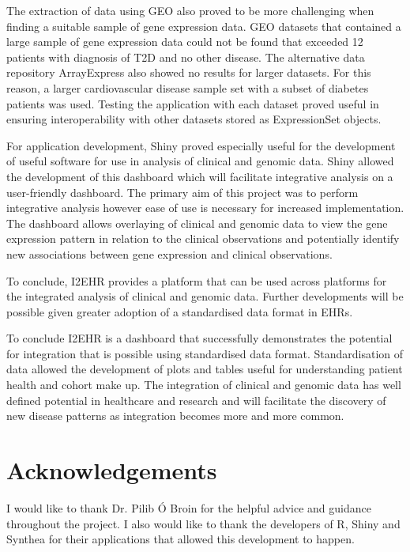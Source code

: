 \documentclass{bioinfo}
\begin{document}
\begin{Discussion}
The extraction of data using GEO also proved to be more challenging when finding a suitable sample of gene expression data. GEO datasets that contained a large sample of gene expression data could not be found that exceeded 12 patients with diagnosis of T2D and no other disease. The alternative data repository ArrayExpress \citep{Athar2018} also showed no results for larger datasets. For this reason, a larger cardiovascular disease sample set with a subset of diabetes patients was used. Testing the application with each dataset proved useful in ensuring interoperability with other datasets stored as ExpressionSet objects. 


For application development, Shiny proved especially useful for the development of useful software for use in analysis of clinical and genomic data. Shiny allowed the development of this dashboard which will facilitate integrative analysis on a user-friendly dashboard. The primary aim of this project was to perform integrative analysis however ease of use is necessary for increased implementation. The dashboard allows overlaying of clinical and genomic data to view the gene expression pattern in relation to the clinical observations and potentially identify new associations between gene expression and clinical observations. 


To conclude, I2EHR provides a platform that can be used across platforms for the integrated analysis of clinical and genomic data. Further developments will be possible given greater adoption of a standardised data format in EHRs.


To conclude I2EHR is a dashboard that successfully demonstrates the potential for integration that is possible using standardised data format. Standardisation of data allowed the development of plots and tables useful for understanding patient health and cohort make up. The integration of clinical and genomic data has well defined potential in healthcare and research and will facilitate the discovery of new disease patterns as integration becomes more and more common. 


\end{Discussion} 


%
%


\section*{Acknowledgements}
I would like to thank Dr. Pilib \'{O} Broin for the helpful advice and guidance throughout the project. I also would like to thank the developers of R, Shiny and Synthea for their applications that allowed this development to happen.
\end{document}
